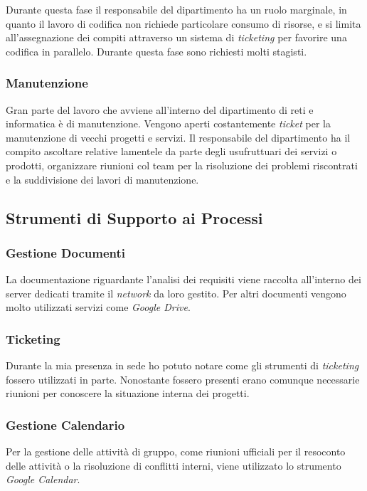 Durante questa fase il responsabile del dipartimento ha un ruolo marginale, in quanto il lavoro di codifica non richiede particolare consumo di risorse, e si limita all'assegnazione dei compiti attraverso un sistema di \textit{ticketing} per favorire una codifica in parallelo. Durante questa fase sono richiesti molti stagisti.

\subsubsection{Manutenzione}

Gran parte del lavoro che avviene all'interno del dipartimento di reti e informatica è di manutenzione. Vengono aperti costantemente \textit{ticket} per la manutenzione di vecchi progetti e servizi. Il responsabile del dipartimento ha il compito  ascoltare relative lamentele da parte degli usufruttuari dei servizi o prodotti, organizzare riunioni col team per la risoluzione dei problemi riscontrati e la suddivisione dei lavori di manutenzione. 

\subsection{Strumenti di Supporto ai Processi}

\subsubsection{Gestione Documenti}
La documentazione riguardante l'analisi dei requisiti viene raccolta all'interno dei server dedicati tramite il \textit{network} da loro gestito. Per altri documenti vengono molto utilizzati servizi come \textit{Google Drive}. 
 


\subsubsection{Ticketing}

Durante la mia presenza in sede ho potuto notare come gli strumenti di \textit{ticketing} fossero utilizzati in parte. Nonostante fossero presenti erano comunque necessarie riunioni per conoscere la situazione interna dei progetti.
\subsubsection{Gestione Calendario}

Per la gestione delle attività di gruppo, come riunioni ufficiali per il resoconto delle attività o la risoluzione di conflitti interni, viene utilizzato lo strumento \textit{Google Calendar}.




